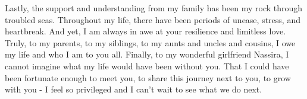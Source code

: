 Lastly, the support and understanding from my family has been my rock through troubled seas. Throughout my life, there have been periods of unease, stress, and heartbreak. And yet, I am always in awe at your resilience and limitless love. Truly, to my parents, to my siblings, to my aunts and uncles and cousins, I owe my life and who I am to you all.
Finally, to my wonderful girlfriend Nassira, I cannot imagine what my life would have been without you. That I could have been fortunate enough to meet you, to share this journey next to you, to grow with you - I feel so privileged and I can't wait to see what we do next. 